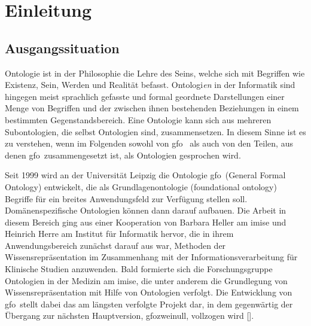 \chapter{Einleitung}\label{chap:einleitung}

\section{Ausgangssituation}
    Ontologie
    ist in der Philosophie die Lehre des Seins, welche sich mit Begriffen wie Existenz, Sein, Werden und Realität befasst.
    Ontologi\textit{en} in der Informatik sind hingegen meist sprachlich gefasste und formal geordnete Darstellungen einer Menge von Begriffen und der zwischen ihnen bestehenden Beziehungen in einem
    bestimmten Gegenstandsbereich. 
    Eine Ontologie kann sich aus mehreren Subontologien, die selbst Ontologien sind, zusammensetzen. In diesem Sinne ist es zu verstehen, wenn im Folgenden sowohl von \ac{gfo}\ 
    als auch von den Teilen, aus denen \ac{gfo}\ zusammengesetzt ist, als Ontologien gesprochen wird.

    Seit
    \marginpar{General Formal Ontology (GFO)}
    1999 wird an der Universität Leipzig die Ontologie \ac{gfo}\ (General Formal Ontology) entwickelt, die als Grundlagenontologie (foundational ontology) Begriffe für ein breites Anwendungsfeld zur Verfügung stellen soll. 
    Domänenspezifische Ontologien können dann darauf aufbauen.
        Die Arbeit in diesem Bereich ging aus einer Kooperation von Barbara 
		Heller am \ac{imise}
		und Heinrich Herre am	Institut für Informatik hervor, 
		die in ihrem Anwendungsbereich zunächst darauf aus war,
		Methoden der Wissensrepräsentation im Zusammenhang mit der Informationsverarbeitung
		für Klinische Studien	anzuwenden.
		Bald formierte sich die Forschungsgruppe %
		Ontologien in der Medizin
		am \ac{imise},
		die unter anderem die Grundlegung von Wissensrepräsentation mit Hilfe von Ontologien
		verfolgt.
		Die Entwicklung von \ac{gfo}\ stellt dabei das am längsten verfolgte Projekt dar,
		in dem gegenwärtig der Übergang zur nächsten Hauptversion, \ac{gfozweinull}, vollzogen wird [\cite{burek-p-2020-32-a}].
    
